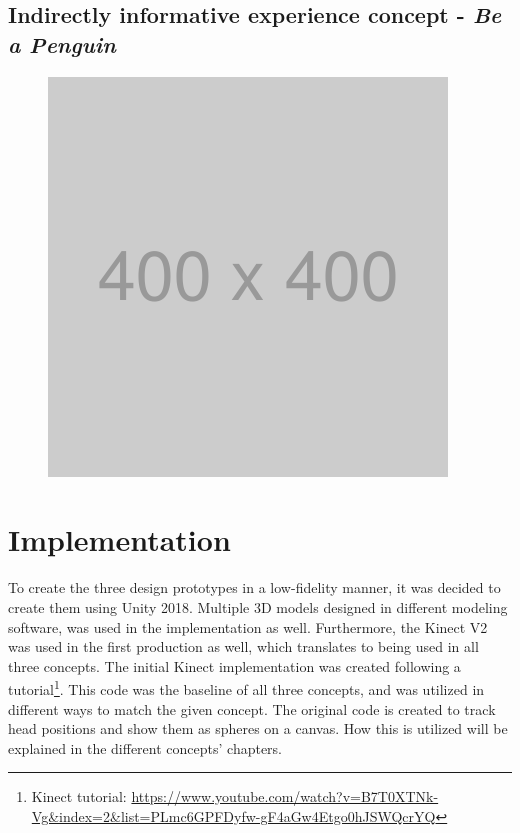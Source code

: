 \subsection{Indirectly informative experience concept - \textit{Be a Penguin}}
\begin{figure}[H]
	\centering
	\includegraphics[width=0.8\linewidth]{figure/placeholder.png}
	\caption{}
	\label{fig:prototypeIndirectInform}
\end{figure}



\section{Implementation}\label{sec:prod1prototypes}
To create the three design prototypes in a low-fidelity manner, it was decided to create them using Unity 2018. Multiple 3D models designed in different modeling software, was used in the implementation as well. Furthermore, the Kinect V2 was used in the first production as well, which translates to being used in all three concepts. The initial Kinect implementation was created following a tutorial\footnote{Kinect tutorial: \url{https://www.youtube.com/watch?v=B7T0XTNk-Vg&index=2&list=PLmc6GPFDyfw-gF4aGw4Etgo0hJSWQcrYQ}}. This code was the baseline of all three concepts, and was utilized in different ways to match the given concept. The original code is created to track head positions and show them as spheres on a canvas. How this is utilized will be explained in the different concepts' chapters. 

